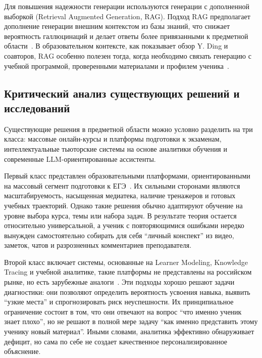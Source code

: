 \documentclass[a4paper,12pt]{extarticle}
\begin{document}
Для повышения надежности генерации используются генерации с дополненной выборкой (Retrieval Augmented Generation, RAG).
Подход RAG предполагает дополнение генерации внешним контекстом из базы знаний, что снижает вероятность 
галлюцинаций и делает ответы более привязанными к предметной области~\cite{lewis2020rag,gao2024ragsurvey}. 
В образовательном контексте, как показывает обзор Y. Ding и соавторов, RAG особенно полезен тогда, 
когда необходимо связать генерацию с учебной программой, проверенными материалами и профилем 
ученика~\cite{ding2025ragedu}.

\subsection{Критический анализ существующих решений и исследований}

Существующие решения в предметной области можно условно разделить на три класса: массовые онлайн-курсы и 
платформы подготовки к экзаменам, интеллектуальные тьюторские системы на основе аналитики обучения и современные 
LLM-ориентированные ассистенты.

Первый класс представлен образовательными платформами, ориентированными на массовый сегмент подготовки 
к ЕГЭ~\cite{egeland2026,umschool2026,maximum2026ege}. Их сильными сторонами являются 
масштабируемость, насыщенная медиатека, наличие тренажеров и готовых учебных траекторий. Однако такие решения 
обычно адаптируют обучение на уровне выбора курса, темы или набора задач. 
В результате теория остается относительно универсальной, а ученик с повторяющимися ошибками нередко вынужден 
самостоятельно собирать для себя ``личный конспект'' из видео, заметок, 
чатов и разрозненных комментариев преподавателя.

Второй класс включает системы, основанные на Learner Modeling, Knowledge Tracing и учебной 
аналитике, такие платформы не представлены на российском рынке, но есть 
зарубежные аналоги~\cite{corbett1994kt,piech2015dkt,abdelrahman2023ktsurvey,khor2024la}. 
Эти подходы хорошо решают задачи 
диагностики: они позволяют определить вероятность усвоения навыка, выявить ``узкие места'' и спрогнозировать риск 
неуспешности. Их принципиальное ограничение состоит в том, что они отвечают на вопрос 
``что именно ученик знает плохо'', но не решают в полной мере задачу 
``как именно представить этому ученику новый материал''. 
Иными словами, аналитика эффективно обнаруживает дефицит, но сама по себе не создает качественное 
персонализированное объяснение.
\end{document}
